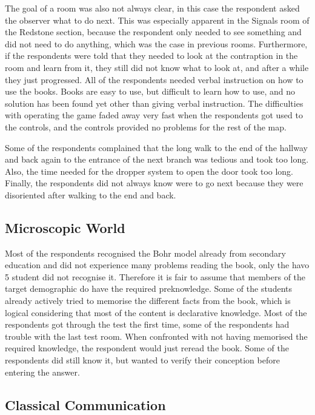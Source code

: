 \documentclass[11pt,twoside]{report} %
\begin{document}
The goal of a room was also not always clear, in this case the respondent asked the observer what to do next. This was especially apparent in the Signals room of the Redstone section, because the respondent only needed to see something and did not need to do anything, which was the case in previous rooms. Furthermore, if the respondents were told that they needed to look at the contraption in the room and learn from it, they still did not know what to look at, and after a while they just progressed. All of the respondents needed verbal instruction on how to use the books. Books are easy to use, but difficult to learn how to use, and no solution has been found yet other than giving verbal instruction. The difficulties with operating the game faded away very fast when the respondents got used to the controls, and the controls provided no problems for the rest of the map.

Some of the respondents complained that the long walk to the end of the hallway and back again to the entrance of the next branch was tedious and took too long. Also, the time needed for the dropper system to open the door took too long. Finally, the respondents did not always know were to go next because they were disoriented after walking to the end and back. 

\subsection{Microscopic World}

Most of the respondents recognised the Bohr model already from secondary education and did not experience many problems reading the book, only the havo 5 student did not recognise it. Therefore it is fair to assume that members of the target demographic do have the required preknowledge. Some of the students already actively tried to memorise the different facts from the book, which is logical considering that most of the content is declarative knowledge. Most of the respondents got through the test the first time, some of the respondents had trouble with the last test room. When confronted with not having memorised the required knowledge, the respondent would just reread the book. Some of the respondents did still know it, but wanted to verify their conception before entering the answer.

\subsection{Classical Communication}
\end{document}
